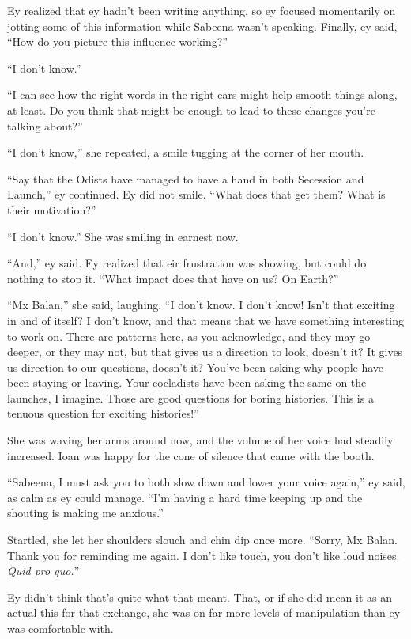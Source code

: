 Ey realized that ey hadn't been writing anything, so ey focused momentarily on jotting some of this information while Sabeena wasn't speaking. Finally, ey said, ``How do you picture this influence working?''

``I don't know.''

``I can see how the right words in the right ears might help smooth things along, at least. Do you think that might be enough to lead to these changes you're talking about?''

``I don't know,'' she repeated, a smile tugging at the corner of her mouth.

``Say that the Odists have managed to have a hand in both Secession and Launch,'' ey continued. Ey did not smile. ``What does that get them? What is their motivation?''

``I don't know.'' She was smiling in earnest now.

``And,'' ey said. Ey realized that eir frustration was showing, but could do nothing to stop it. ``What impact does that have on us? On Earth?''

``Mx Balan,'' she said, laughing. ``I don't know. I don't know! Isn't that exciting in and of itself? I don't know, and that means that we have something interesting to work on. There are patterns here, as you acknowledge, and they may go deeper, or they may not, but that gives us a direction to look, doesn't it? It gives us direction to our questions, doesn't it? You've been asking why people have been staying or leaving. Your cocladists have been asking the same on the launches, I imagine. Those are good questions for boring histories. This is a tenuous question for exciting histories!''

She was waving her arms around now, and the volume of her voice had steadily increased. Ioan was happy for the cone of silence that came with the booth.

``Sabeena, I must ask you to both slow down and lower your voice again,'' ey said, as calm as ey could manage. ``I'm having a hard time keeping up and the shouting is making me anxious.''

Startled, she let her shoulders slouch and chin dip once more. ``Sorry, Mx Balan. Thank you for reminding me again. I don't like touch, you don't like loud noises. \emph{Quid pro quo.}''

Ey didn't think that's quite what that meant. That, or if she did mean it as an actual this-for-that exchange, she was on far more levels of manipulation than ey was comfortable with.

